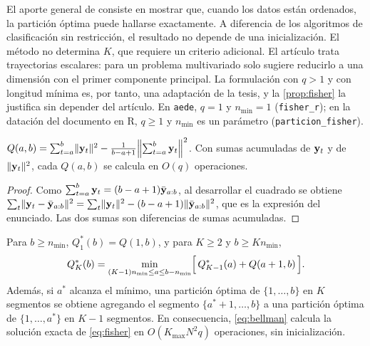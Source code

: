 El aporte general de \textcite{fisher_1958} consiste en mostrar que, cuando los datos están
ordenados, la partición óptima puede hallarse exactamente. A diferencia de los algoritmos de
clasificación sin restricción, el resultado no depende de una inicialización. El método no
determina $K$, que requiere un criterio adicional. El artículo trata trayectorias escalares: para
un problema multivariado solo sugiere reducirlo a una dimensión con el primer componente
principal. La formulación con $q>1$ y con longitud mínima es, por tanto, una adaptación de la
tesis, y la \cref{prop:fisher} la justifica sin depender del artículo. En \texttt{aede}, $q=1$ y $n_{\min}=1$
(\texttt{fisher\_r}); en la datación del documento en R, $q\ge1$ y $n_{\min}$ es un parámetro
(\texttt{particion\_fisher}).

\begin{lema}\label{lem:costo}
$Q(a,b)=\sum_{t=a}^{b}\lVert \mathbf{y}_t\rVert^2-\frac{1}{b-a+1}\Bigl\lVert\sum_{t=a}^{b}\mathbf{y}_t\Bigr\rVert^2$.
Con sumas acumuladas de $\mathbf{y}_t$ y de $\lVert \mathbf{y}_t\rVert^2$, cada $Q(a,b)$ se calcula en $O(q)$
operaciones.
\end{lema}

\begin{proof}
Como $\sum_{t=a}^{b}\mathbf{y}_t=(b-a+1)\bar{\mathbf{y}}_{a:b}$, al desarrollar el cuadrado se obtiene
$\sum_t\lVert \mathbf{y}_t-\bar{\mathbf{y}}_{a:b}\rVert^2=\sum_t\lVert \mathbf{y}_t\rVert^2-(b-a+1)\lVert \bar{\mathbf{y}}_{a:b}\rVert^2$, que es la
expresión del enunciado. Las dos sumas son diferencias de sumas acumuladas.
\end{proof}

\begin{proposicion}\label{prop:fisher}
Para $b\ge n_{\min}$, $Q^\ast_1(b)=Q(1,b)$, y para $K\ge2$ y $b\ge Kn_{\min}$,
\begin{equation}\label{eq:bellman}
  Q^\ast_K(b)=\min_{(K-1)n_{\min}\le a\le b-n_{\min}}\Bigl[\,Q^\ast_{K-1}(a)+Q(a+1,b)\,\Bigr].
\end{equation}
Además, si $a^\ast$ alcanza el mínimo, una partición óptima de $\{1,\dots,b\}$ en $K$ segmentos
se obtiene agregando el segmento $\{a^\ast+1,\dots,b\}$ a una partición óptima de
$\{1,\dots,a^\ast\}$ en $K-1$ segmentos. En consecuencia, \cref{eq:bellman} calcula la solución
exacta de \cref{eq:fisher} en $O(K_{\max}N^2q)$ operaciones, sin inicialización.
\end{proposicion}

